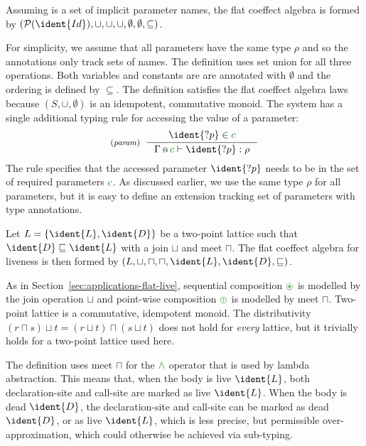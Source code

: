 \begin{example}
Assuming  is a set of implicit parameter names, the flat coeffect algebra 
is formed by $(\mathcal{P}(\ident{Id}), \cup, \cup, \cup, \emptyset, \emptyset, \subseteq)$.
\end{example}

\noindent
For simplicity, we assume that all parameters have the same type $\rho$ and so the annotations only
track sets of names. The definition uses set union for all three operations. Both variables and
constants are are annotated with $\emptyset$ and the ordering is defined by $\subseteq$. The 
definition satisfies the flat coeffect algebra laws because $(S, \cup, \emptyset)$ is an idempotent, 
commutative monoid. The system has a single additional typing rule for accessing the value of a
parameter:
%
\begin{equation*}
\tyrule{param}
  { \ident{?p} \in \cclrd{c} }
  { \coctx{\Gamma}{\cclrd{c}} \vdash \ident{?p} : \rho }
\end{equation*}
%
The rule specifies that the accessed parameter $\ident{?p}$ needs to be in the set of required
parameters $\cclrd{c}$. As discussed earlier, we use the same type $\rho$ for all parameters, but
it is easy to define an extension tracking set of parameters with type annotations.

\begin{example}[Liveness]
Let $L=\{ \ident{L}, \ident{D} \}$ be a two-point lattice such that $\ident{D} \sqsubseteq \ident{L}$
with a join $\sqcup$ and meet $\sqcap$. The flat coeffect algebra for liveness is then formed by
$(L, \sqcup, \sqcap, \sqcap, \ident{L}, \ident{D}, \sqsubseteq)$.
\end{example}

\noindent
As in Section~\ref{sec:applications-flat-live}, sequential composition $\cseq$ is modelled by 
the join operation $\sqcup$ and point-wise composition $\cpar$ is modelled by meet $\sqcap$. 
Two-point lattice is a commutative, idempotent monoid. The distributivity 
$(r \sqcap s) \sqcup t = (r \sqcup t) \sqcap (s \sqcup t)$ does not hold for \emph{every} 
lattice, but it trivially holds for a two-point lattice used here.

The definition uses meet $\sqcap$ for the $\czip$ operator that is used by lambda abstraction.
This means that, when the body is live $\ident{L}$, both declaration-site and call-site are 
marked as live $\ident{L}$. When the body is dead $\ident{D}$, the declaration-site and call-site
can be marked as dead $\ident{D}$, or as live $\ident{L}$, which is less precise, but permissible
over-approximation, which could otherwise be achieved via sub-typing.

